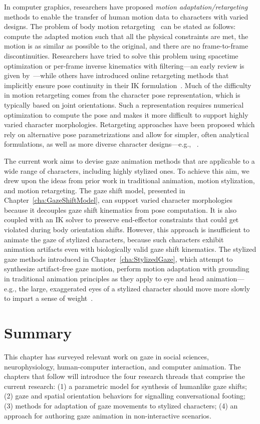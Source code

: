 In computer graphics, researchers have proposed \emph{motion adaptation/retargeting} methods to enable the transfer of human motion data to characters with varied designs. The problem of body motion retargeting~\citep{gleicher1998retargetting} can be stated as follows: compute the adapted motion such that all the physical constraints are met, the motion is as similar as possible to the original, and there are no frame-to-frame discontinuities. Researchers have tried to solve this problem using spacetime optimization or per-frame inverse kinematics with filtering---an early review is given by~\citet{gleicher2001comparing}---while others have introduced online retargeting methods that implicitly ensure pose continuity in their IK formulation~\citep{shin2001puppetry}. Much of the difficulty in motion retargeting comes from the character pose representation, which is typically based on joint orientations. Such a representation requires numerical optimization to compute the pose and makes it more difficult to support highly varied character morphologies. Retargeting approaches have been proposed which rely on alternative pose parametrizations and allow for simpler, often analytical formulations, as well as more diverse character designs---e.g., ~\citet{multon2008mkm,hecker2008real,ho2010spatial}.

The current work aims to devise gaze animation methods that are applicable to a wide range of characters, including highly stylized ones. To achieve this aim, we drew upon the ideas from prior work in traditional animation, motion stylization, and motion retargeting. The gaze shift model, presented in Chapter~\ref{cha:GazeShiftModel}, can support varied character morphologies because it decouples gaze shift kinematics from pose computation. It is also coupled with an IK solver to preserve end-effector constraints that could get violated during body orientation shifts. However, this approach is insufficient to animate the gaze of stylized characters, because such characters exhibit animation artifacts even with biologically valid gaze shift kinematics. The stylized gaze methods introduced in Chapter~\ref{cha:StylizedGaze}, which attempt to synthesize artifact-free gaze motion, perform motion adaptation with grounding in traditional animation principles as they apply to eye and head animation---e.g., the large, exaggerated eyes of a stylized character should move more slowly to impart a sense of weight~\citep{williams2009animator}.

\section{Summary}

This chapter has surveyed relevant work on gaze in social sciences, neurophysiology, human-computer interaction, and computer animation. The chapters that follow will introduce the four research threads that comprise the current research: (1) a parametric model for synthesis of humanlike gaze shifts; (2) gaze and spatial orientation behaviors for signalling conversational footing; (3) methods for adaptation of gaze movements to stylized characters; (4) an approach for authoring gaze animation in non-interactive scenarios. 